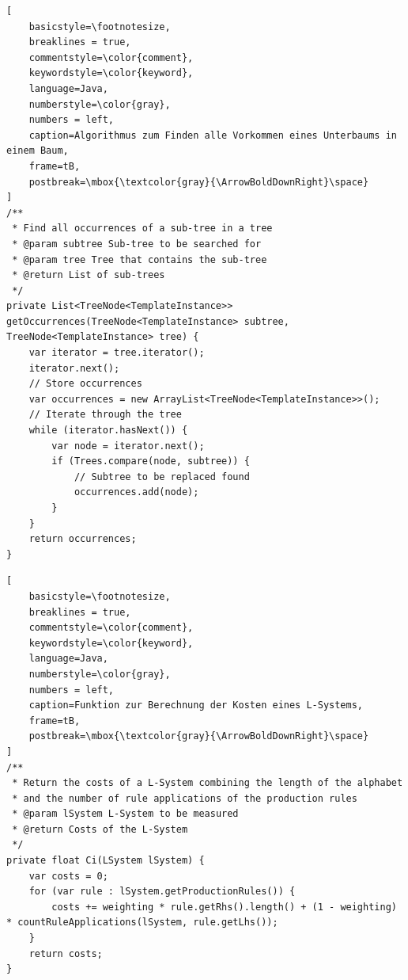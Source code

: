 \newpage

\begin{lstlisting}[
    basicstyle=\footnotesize,
    breaklines = true,
    commentstyle=\color{comment},
    keywordstyle=\color{keyword},
    language=Java,
    numberstyle=\color{gray},
    numbers = left,
    caption=Algorithmus zum Finden alle Vorkommen eines Unterbaums in einem Baum,
    frame=tB,
    postbreak=\mbox{\textcolor{gray}{\ArrowBoldDownRight}\space}
]
/**
 * Find all occurrences of a sub-tree in a tree
 * @param subtree Sub-tree to be searched for
 * @param tree Tree that contains the sub-tree
 * @return List of sub-trees
 */
private List<TreeNode<TemplateInstance>> getOccurrences(TreeNode<TemplateInstance> subtree, TreeNode<TemplateInstance> tree) {
    var iterator = tree.iterator();
    iterator.next();
    // Store occurrences
    var occurrences = new ArrayList<TreeNode<TemplateInstance>>();
    // Iterate through the tree
    while (iterator.hasNext()) {
        var node = iterator.next();
        if (Trees.compare(node, subtree)) {
            // Subtree to be replaced found
            occurrences.add(node);
        }
    }
    return occurrences;
}
\end{lstlisting}
\begin{lstlisting}[
    basicstyle=\footnotesize,
    breaklines = true,
    commentstyle=\color{comment},
    keywordstyle=\color{keyword},
    language=Java,
    numberstyle=\color{gray},
    numbers = left,
    caption=Funktion zur Berechnung der Kosten eines L-Systems,
    frame=tB,
    postbreak=\mbox{\textcolor{gray}{\ArrowBoldDownRight}\space}
]
/**
 * Return the costs of a L-System combining the length of the alphabet
 * and the number of rule applications of the production rules
 * @param lSystem L-System to be measured
 * @return Costs of the L-System
 */
private float Ci(LSystem lSystem) {
    var costs = 0;
    for (var rule : lSystem.getProductionRules()) {
        costs += weighting * rule.getRhs().length() + (1 - weighting) * countRuleApplications(lSystem, rule.getLhs());
    }
    return costs;
}
\end{lstlisting}

\newpage

